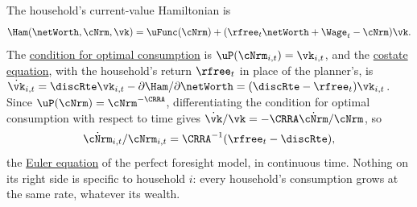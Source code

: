 \documentclass{econark}
\begin{document}
The household's current-value Hamiltonian is
\begin{equation*}
  \Ham(\netWorth,\cNrm,\vk) = \uFunc(\cNrm) + (\rfree_{t}\netWorth + \Wage_{t} - \cNrm)\vk .
\end{equation*}
The \href{https://intertemporal-choice.github.io/content/appendices/mathematical/hamiltonianvsdiscrete/\#eq-uceqvk}{condition for optimal consumption} is $\uP(\cNrm_{i,t}) = \vk_{i,t}$, and the \href{https://intertemporal-choice.github.io/content/appendices/mathematical/hamiltonianvsdiscrete/\#eq-lamgrow}{costate equation}, with the household's return $\rfree_{t}$ in place of the planner's, is $\dot{\vk}_{i,t} = \discRte\vk_{i,t} - \partial\Ham/\partial\netWorth = (\discRte-\rfree_{t})\vk_{i,t}$. Since $\uP(\cNrm) = \cNrm^{-\CRRA}$, differentiating the condition for optimal consumption with respect to time gives $\dot{\vk}/\vk = -\CRRA\dot{\cNrm}/\cNrm$, so
\begin{equation}
  \dot{\cNrm}_{i,t}/\cNrm_{i,t} = \CRRA^{-1}(\rfree_{t}-\discRte), \label{eq:cdotindiv}
\end{equation}
the \href{https://intertemporal-choice.github.io/content/consumption/perfforesightcrra/\#eq-pfcrra-cgrow}{Euler equation} of the perfect foresight model, in continuous time. Nothing on its right side is specific to household $i$: every household's consumption grows at the same rate, whatever its wealth.
\end{document}
